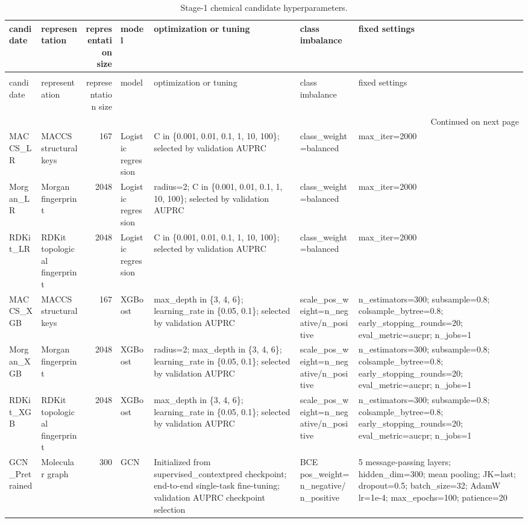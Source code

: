 \begin{longtable}{llrllll}
\caption{Stage-1 chemical candidate hyperparameters.} \label{tab:stage1_hyperparameters} \\
\toprule
candidate & representation & representation size & model & optimization or tuning & class imbalance & fixed settings \\
\midrule
\endfirsthead
\caption[]{Stage-1 chemical candidate hyperparameters.} \\
\toprule
candidate & representation & representation size & model & optimization or tuning & class imbalance & fixed settings \\
\midrule
\endhead
\midrule
\multicolumn{7}{r}{Continued on next page} \\
\midrule
\endfoot
\bottomrule
\endlastfoot
MACCS\_LR & MACCS structural keys & 167 & Logistic regression & C in \{0.001, 0.01, 0.1, 1, 10, 100\}; selected by validation AUPRC & class\_weight=balanced & max\_iter=2000 \\
Morgan\_LR & Morgan fingerprint & 2048 & Logistic regression & radius=2; C in \{0.001, 0.01, 0.1, 1, 10, 100\}; selected by validation AUPRC & class\_weight=balanced & max\_iter=2000 \\
RDKit\_LR & RDKit topological fingerprint & 2048 & Logistic regression & C in \{0.001, 0.01, 0.1, 1, 10, 100\}; selected by validation AUPRC & class\_weight=balanced & max\_iter=2000 \\
MACCS\_XGB & MACCS structural keys & 167 & XGBoost & max\_depth in \{3, 4, 6\}; learning\_rate in \{0.05, 0.1\}; selected by validation AUPRC & scale\_pos\_weight=n\_negative/n\_positive & n\_estimators=300; subsample=0.8; colsample\_bytree=0.8; early\_stopping\_rounds=20; eval\_metric=aucpr; n\_jobs=1 \\
Morgan\_XGB & Morgan fingerprint & 2048 & XGBoost & radius=2; max\_depth in \{3, 4, 6\}; learning\_rate in \{0.05, 0.1\}; selected by validation AUPRC & scale\_pos\_weight=n\_negative/n\_positive & n\_estimators=300; subsample=0.8; colsample\_bytree=0.8; early\_stopping\_rounds=20; eval\_metric=aucpr; n\_jobs=1 \\
RDKit\_XGB & RDKit topological fingerprint & 2048 & XGBoost & max\_depth in \{3, 4, 6\}; learning\_rate in \{0.05, 0.1\}; selected by validation AUPRC & scale\_pos\_weight=n\_negative/n\_positive & n\_estimators=300; subsample=0.8; colsample\_bytree=0.8; early\_stopping\_rounds=20; eval\_metric=aucpr; n\_jobs=1 \\
GCN\_Pretrained & Molecular graph & 300 & GCN & Initialized from supervised\_contextpred checkpoint; end-to-end single-task fine-tuning; validation AUPRC checkpoint selection & BCE pos\_weight=n\_negative/n\_positive & 5 message-passing layers; hidden\_dim=300; mean pooling; JK=last; dropout=0.5; batch\_size=32; AdamW lr=1e-4; max\_epochs=100; patience=20 \\

\end{longtable}
